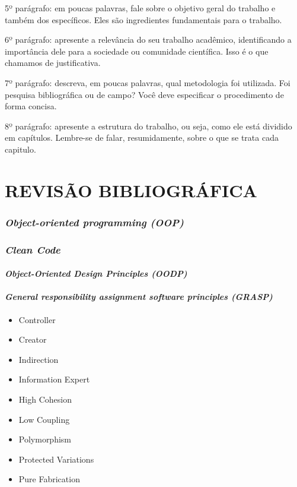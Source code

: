 \documentclass[12pt]{article}
\begin{document}
5º parágrafo: em poucas palavras, fale sobre o objetivo geral do trabalho e também dos específicos. Eles são ingredientes fundamentais para o trabalho.

6º parágrafo: apresente a relevância do seu trabalho acadêmico, identificando a importância dele para a sociedade ou comunidade científica. Isso é o que chamamos de justificativa.

7º parágrafo: descreva, em poucas palavras, qual metodologia foi utilizada. Foi pesquisa bibliográfica ou de campo? Você deve especificar o procedimento de forma concisa.

8º parágrafo: apresente a estrutura do trabalho, ou seja, como ele está dividido em capítulos. Lembre-se de falar, resumidamente, sobre o que se trata cada capitulo.



\part{REVISÃO BIBLIOGRÁFICA} \label{sec:revisaobibliografica}
\section{\textit{Object-oriented programming (OOP)}} \label{sec:oop}
\section{\textit{Clean Code}} \label{sec:cleancode}
\subsection{\textit{Object-Oriented Design Principles (OODP)}} \label{sec:oopd}
\subsection{\textit{General responsibility assignment software principles (GRASP)}} \label{sec:grasp}

\begin{itemize}
	\item Controller
	\item Creator
	\item Indirection
	\item Information Expert
	\item High Cohesion
	\item Low Coupling
	\item Polymorphism
	\item Protected Variations
	\item Pure Fabrication
\end{itemize}
\end{document}
